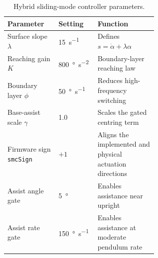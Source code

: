 \begin{table}[htbp]
  \centering
  \footnotesize
  \renewcommand{\arraystretch}{1.05}
  \caption{Hybrid sliding-mode controller parameters.}
  \begin{tabularx}{\linewidth}{@{}p{0.34\linewidth}p{0.26\linewidth}X@{}}
    \toprule
    Parameter & Setting & Function \\
    \midrule
    Surface slope $\lambda$ & \SI{15}{s^{-1}} & Defines $s=\dot{\alpha}+\lambda\alpha$ \\
    Reaching gain $K$ & \SI{800}{\degree\per\second\squared} & Boundary-layer reaching law \\
    Boundary layer $\phi$ & \SI{50}{\degree\per\second} & Reduces high-frequency switching \\
    Base-assist scale $\gamma$ & 1.0 & Scales the gated centring term \\
    Firmware sign \texttt{smcSign} & $+1$ & Aligns the implemented and physical actuation directions \\
    Assist angle gate & \SI{5}{\degree} & Enables assistance near upright \\
    Assist rate gate & \SI{150}{\degree\per\second} & Enables assistance at moderate pendulum rate \\
    \bottomrule
  \end{tabularx}
\end{table}

